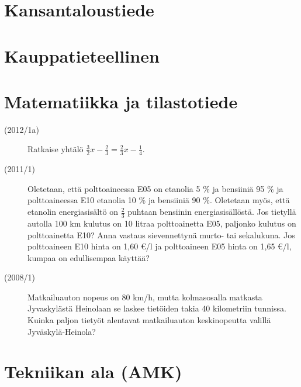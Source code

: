 \section{Kansantaloustiede}

\section{Kauppatieteellinen}

\section{Matematiikka ja tilastotiede}

\begin{description}
	\item[(2012/1a)] Ratkaise yhtälö $\frac{3}{2}x - \frac{2}{3} = \frac{2}{3}x - \frac{1}{4}$.
	\item[(2011/1)] Oletetaan, että polttoaineessa E05 on etanolia 5 \% ja
        bensiiniä 95 \% ja polttoaineessa E10 etanolia 10 \% ja bensiiniä 90 \%.
        Oletetaan myös, että etanolin energiasisältö on $\frac{2}{3}$ puhtaan bensiinin
		energiasisällöstä. Jos tietyllä autolla 100 km kulutus on 10 litraa
        polttoainetta E05, paljonko kulutus on polttoainetta E10? Anna vastaus
        sievennettynä murto- tai sekalukuna. Jos polttoaineen E10 hinta on 1,60 €/l
        ja polttoaineen E05 hinta on 1,65 €/l, kumpaa on edullisempaa käyttää?
	\item[(2008/1)] Matkailuauton nopeus on 80 km/h, mutta kolmasosalla matkasta
        Jyvaskylästä Heinolaan se laskee tietöiden takia 40 kilometriin tunnissa.
        Kuinka paljon tietyöt alentavat matkailuauton keskinopeutta valillä Jyväskylä-Heinola?
\end{description}

\section{Tekniikan ala (AMK)}

